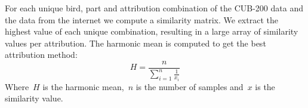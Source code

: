 \documentclass[a4paper, 12pt, oneside]{book} %
\begin{document}
For each unique bird, part and attribution combination of the CUB-200 data and the data from the internet we compute a similarity matrix.
We extract the highest value of each unique combination, resulting in a large array of similarity values per attribution.
The harmonic mean is computed to get the best attribution method:
\begin{equation}
    H = \frac{n}{\sum\limits_{i=1}^n \frac1{x_i}}
\end{equation}
Where~$H$ is the harmonic mean,~$n$ is the number of samples and~$x$ is the similarity value. 

\end{document}
